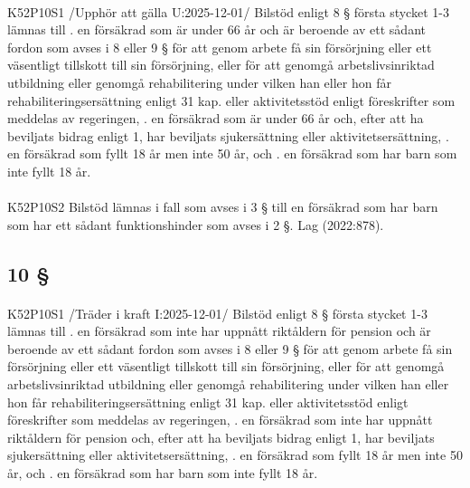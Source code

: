 \documentclass[a4paper,notitlepage,openany,10pt]{book}
\begin{document}
\paragraph*{}
{\tiny K52P10S1}
/Upphör att gälla U:2025-12-01/
Bilstöd enligt 8 § första stycket 1-3 lämnas till
. en försäkrad som är under 66 år och är beroende av ett sådant fordon som avses i 8 eller 9 § för att genom arbete få sin försörjning eller ett väsentligt tillskott till sin försörjning, eller för att genomgå arbetslivsinriktad utbildning eller genomgå rehabilitering under vilken han eller hon får rehabiliteringsersättning enligt 31 kap. eller aktivitetsstöd enligt föreskrifter som meddelas av regeringen,
. en försäkrad som är under 66 år och, efter att ha beviljats bidrag enligt 1, har beviljats sjukersättning eller aktivitetsersättning,
. en försäkrad som fyllt 18 år men inte 50 år, och
. en försäkrad som har barn som inte fyllt 18 år.
\paragraph*{}
{\tiny K52P10S2}
Bilstöd lämnas i fall som avses i 3 § till en försäkrad som har barn som har ett sådant funktionshinder som avses i 2 §.
Lag (2022:878).
\subsection*{10 §}
\paragraph*{}
{\tiny K52P10S1}
/Träder i kraft I:2025-12-01/
Bilstöd enligt 8 § första stycket 1-3 lämnas till
. en försäkrad som inte har uppnått riktåldern för pension och är beroende av ett sådant fordon som avses i 8 eller 9 § för att genom arbete få sin försörjning eller ett väsentligt tillskott till sin försörjning, eller för att genomgå arbetslivsinriktad utbildning eller genomgå rehabilitering under vilken han eller hon får rehabiliteringsersättning enligt 31 kap. eller aktivitetsstöd enligt föreskrifter som meddelas av regeringen,
. en försäkrad som inte har uppnått riktåldern för pension och, efter att ha beviljats bidrag enligt 1, har beviljats sjukersättning eller aktivitetsersättning,
. en försäkrad som fyllt 18 år men inte 50 år, och
. en försäkrad som har barn som inte fyllt 18 år.
\end{document}
